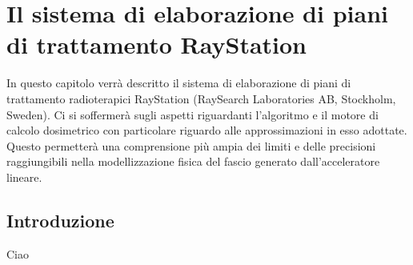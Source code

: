 \chapter{Il sistema di elaborazione di piani di trattamento RayStation}
\setcounter{minitocdepth}{1}
\minitoc
\setcounter{minitocdepth}{2}
\textsf{In questo capitolo verrà descritto il sistema di elaborazione di piani di trattamento radioterapici RayStation (RaySearch Laboratories AB, Stockholm, Sweden). Ci si soffermerà sugli aspetti riguardanti l'algoritmo e il motore di calcolo dosimetrico con particolare riguardo alle approssimazioni in esso adottate. Questo permetterà una comprensione più ampia dei limiti e delle precisioni raggiungibili nella modellizzazione fisica del fascio generato dall'acceleratore lineare.}

\section{Introduzione}
Ciao

